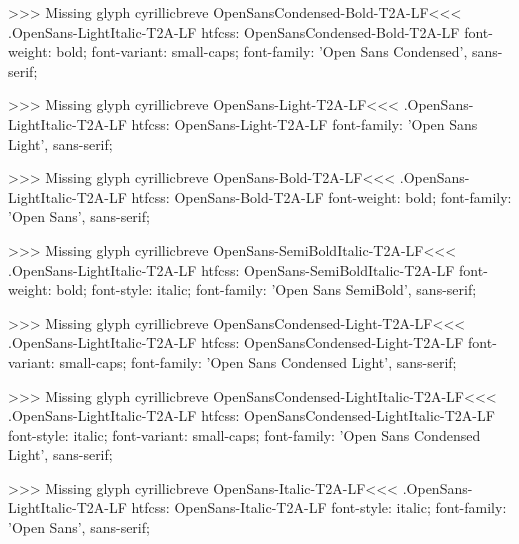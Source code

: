 >>>
Missing glyph	cyrillicbreve
\<OpenSansCondensed-Bold-T2A-LF\><<<
.OpenSans-LightItalic-T2A-LF
htfcss:  OpenSansCondensed-Bold-T2A-LF  font-weight: bold; font-variant: small-caps; font-family: 'Open Sans Condensed', sans-serif;

>>>
Missing glyph	cyrillicbreve
\<OpenSans-Light-T2A-LF\><<<
.OpenSans-LightItalic-T2A-LF
htfcss:  OpenSans-Light-T2A-LF  font-family: 'Open Sans Light', sans-serif;

>>>
Missing glyph	cyrillicbreve
\<OpenSans-Bold-T2A-LF\><<<
.OpenSans-LightItalic-T2A-LF
htfcss:  OpenSans-Bold-T2A-LF  font-weight: bold; font-family: 'Open Sans', sans-serif;

>>>
Missing glyph	cyrillicbreve
\<OpenSans-SemiBoldItalic-T2A-LF\><<<
.OpenSans-LightItalic-T2A-LF
htfcss:  OpenSans-SemiBoldItalic-T2A-LF  font-weight: bold; font-style: italic; font-family: 'Open Sans SemiBold', sans-serif;

>>>
Missing glyph	cyrillicbreve
\<OpenSansCondensed-Light-T2A-LF\><<<
.OpenSans-LightItalic-T2A-LF
htfcss:  OpenSansCondensed-Light-T2A-LF  font-variant: small-caps; font-family: 'Open Sans Condensed Light', sans-serif;

>>>
Missing glyph	cyrillicbreve
\<OpenSansCondensed-LightItalic-T2A-LF\><<<
.OpenSans-LightItalic-T2A-LF
htfcss:  OpenSansCondensed-LightItalic-T2A-LF  font-style: italic; font-variant: small-caps; font-family: 'Open Sans Condensed Light', sans-serif;

>>>
Missing glyph	cyrillicbreve
\<OpenSans-Italic-T2A-LF\><<<
.OpenSans-LightItalic-T2A-LF
htfcss:  OpenSans-Italic-T2A-LF  font-style: italic; font-family: 'Open Sans', sans-serif;

